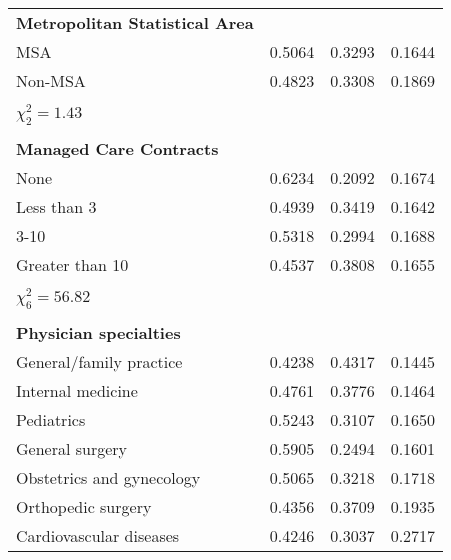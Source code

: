 \begin{table}[h]
\begin{tabular}{@{}llll@{}}
\textbf{Metropolitan Statistical Area} &          &            &            \\
MSA                                    & 0.5064   & 0.3293     & 0.1644     \\
Non-MSA                                & 0.4823   & 0.3308     & 0.1869     \\
                                       &          &            &            \\
$\chi^2_2 = 1.43$                      &          &            &            \\
                                       &          &            &            \\
\textbf{Managed Care Contracts}        &          &            &            \\
None                                   & 0.6234   & 0.2092     & 0.1674     \\
Less than 3                            & 0.4939   & 0.3419     & 0.1642     \\
3-10                                   & 0.5318   & 0.2994     & 0.1688     \\
Greater than 10                        & 0.4537   & 0.3808     & 0.1655     \\
                                       &          &            &            \\
$\chi^2_6 = 56.82$                     &          &            &            \\
                                       &          &            &            \\
\textbf{Physician specialties}         &          &            &            \\
General/family practice                & 0.4238   & 0.4317     & 0.1445     \\
Internal medicine                      & 0.4761   & 0.3776     & 0.1464     \\
Pediatrics                             & 0.5243   & 0.3107     & 0.1650     \\
General surgery                        & 0.5905   & 0.2494     & 0.1601     \\
Obstetrics and gynecology              & 0.5065   & 0.3218     & 0.1718     \\
Orthopedic surgery                     & 0.4356   & 0.3709     & 0.1935     \\
Cardiovascular diseases                & 0.4246   & 0.3037     & 0.2717     \\

\end{tabular}
\end{table}
